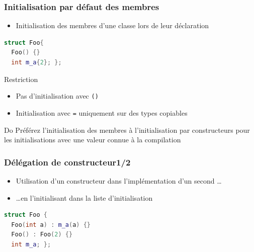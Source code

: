 \documentclass[C++.tex]{subfiles}
\begin{document}
\begin{frame}[fragile]
	\frametitle{Initialisation par défaut des membres}
	\begin{itemize}
		\item Initialisation des membres d'une classe lors de leur déclaration
	\end{itemize}

	\begin{lstlisting}[language=C++]
struct Foo{
  Foo() {}
  int m_a{2}; };\end{lstlisting}

	\begin{alertblock}{Restriction}
		\begin{itemize}
			\item Pas d'initialisation avec \lstinline|()|
			\item Initialisation avec \lstinline|=| uniquement sur des types copiables
		\end{itemize}
	\end{alertblock}

	\begin{exampleblock}{Do}
		Préférez l'initialisation des membres à l'initialisation par constructeurs pour les initialisations avec une valeur connue à la compilation

	\end{exampleblock}
\end{frame}

\begin{frame}[fragile]
	\frametitle{Délégation de constructeur\titlehfill{}1/2}
	\begin{itemize}
		\item Utilisation d'un constructeur dans l'implémentation d'un second \ldots
		\item \ldots{}en \og l'initialisant\fg{} dans la liste d'initialisation
	\end{itemize}

	\begin{lstlisting}[language=C++]
struct Foo {
  Foo(int a) : m_a(a) {}
  Foo() : Foo(2) {}
  int m_a; };\end{lstlisting}
\end{frame}
\end{document}
